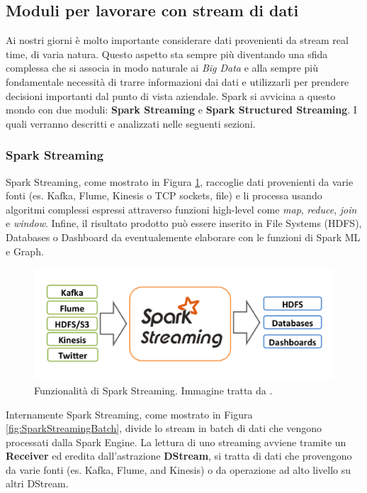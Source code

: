 \documentclass[12pt,italian]{article}
\begin{document}
\subsection{Moduli per lavorare con stream di dati}
Ai nostri giorni è molto importante considerare dati provenienti da stream real time, di varia natura. Questo aspetto sta sempre più diventando una sfida complessa che si associa in modo naturale ai \textit{Big Data} e alla sempre più fondamentale necessità di trarre informazioni dai dati e utilizzarli per prendere decisioni importanti dal punto di vista aziendale. \newline
Spark si avvicina a questo mondo con due moduli: \textbf{Spark Streaming} e \textbf{Spark Structured Streaming}. I quali verranno descritti e analizzati nelle seguenti sezioni.
\subsubsection{Spark Streaming}
Spark Streaming, come mostrato in Figura \ref{fig:SparkStreaming}, raccoglie dati provenienti da varie fonti (es. Kafka, Flume, Kinesis o TCP sockets, file) e li processa usando algoritmi complessi espressi attraverso funzioni high-level come \textit{map}, \textit{reduce}, \textit{join} e \textit{window}. Infine, il risultato prodotto può essere inserito in File Systems (HDFS), Databases o Dashboard da eventualemente elaborare con le funzioni di Spark ML e Graph.
\begin{figure}[H]
	\centering 
	\includegraphics[width=1\linewidth]{img/sparkStreaming.png}
	\caption{Funzionalità di Spark Streaming. Immagine tratta da \cite{spark}.}
	\label{fig:SparkStreaming}
\end{figure}
\par Internamente Spark Streaming, come mostrato in  Figura \ref{fig:SparkStreamingBatch}, divide lo stream in batch di dati che vengono processati dalla Spark Engine.
\newline
La lettura di uno streaming avviene tramite un \textbf{Receiver} ed eredita dall'astrazione \textbf{DStream}, si tratta di dati che provengono da varie fonti (es. Kafka, Flume, and Kinesis) o da operazione ad alto livello su altri DStream.
\end{document}
